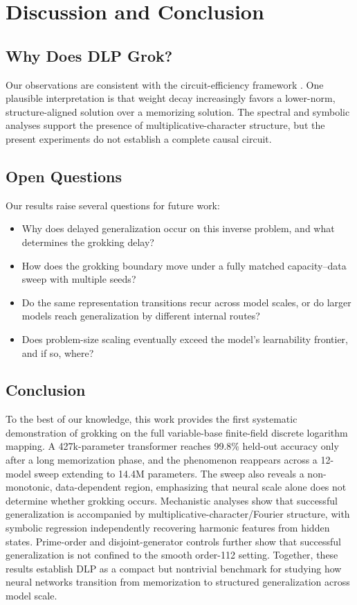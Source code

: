\documentclass[twoside,11pt]{article}
\begin{document}
\FloatBarrier
\section{Discussion and Conclusion}
\label{sec:discussion}

\subsection{Why Does DLP Grok?}

Our observations are consistent with the circuit-efficiency framework \citep{varma2023explaining}. One plausible interpretation is that weight decay increasingly favors a lower-norm, structure-aligned solution over a memorizing solution. The spectral and symbolic analyses support the presence of multiplicative-character structure, but the present experiments do not establish a complete causal circuit.

\subsection{Open Questions}

Our results raise several questions for future work:
\begin{itemize}[leftmargin=*]
    \item Why does delayed generalization occur on this inverse problem, and what determines the grokking delay?
    \item How does the grokking boundary move under a fully matched capacity--data sweep with multiple seeds?
    \item Do the same representation transitions recur across model scales, or do larger models reach generalization by different internal routes?
    \item Does problem-size scaling eventually exceed the model's learnability frontier, and if so, where?
\end{itemize}

\subsection{Conclusion}

To the best of our knowledge, this work provides the first systematic demonstration of grokking on the full variable-base finite-field discrete logarithm mapping. A 427k-parameter transformer reaches 99.8\% held-out accuracy only after a long memorization phase, and the phenomenon reappears across a 12-model sweep extending to 14.4M parameters. The sweep also reveals a non-monotonic, data-dependent region, emphasizing that neural scale alone does not determine whether grokking occurs. Mechanistic analyses show that successful generalization is accompanied by multiplicative-character/Fourier structure, with symbolic regression independently recovering harmonic features from hidden states. Prime-order and disjoint-generator controls further show that successful generalization is not confined to the smooth order-112 setting. Together, these results establish DLP as a compact but nontrivial benchmark for studying how neural networks transition from memorization to structured generalization across model scale.
\end{document}
